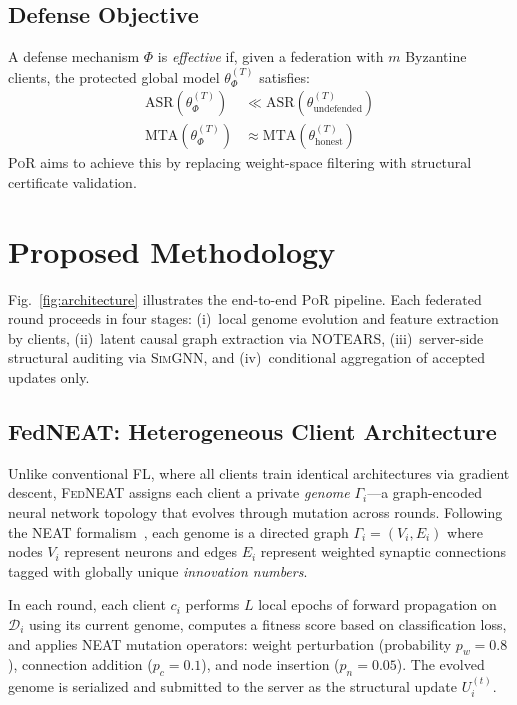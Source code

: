 \documentclass[journal]{IEEEtran}
\newcommand{\por}{\textsc{PoR}}
\newcommand{\fedneat}{\textsc{FedNEAT}}
\newcommand{\simgnn}{\textsc{SimGNN}}
\newcommand{\notears}{\textsc{NOTEARS}}
\newcommand{\asr}{\ensuremath{\mathrm{ASR}}}
\newcommand{\mta}{\ensuremath{\mathrm{MTA}}}
\newcommand{\calD}{\mathcal{D}}
\begin{document}
\subsection{Defense Objective}

A defense mechanism $\Phi$ is \textit{effective} if, given a federation with
$m$ Byzantine clients, the protected global model $\theta^{(T)}_\Phi$
satisfies:
\begin{align}
  \asr(\theta^{(T)}_\Phi) &\ll \asr(\theta^{(T)}_{\text{undefended}}) \\
  \mta(\theta^{(T)}_\Phi) &\approx \mta(\theta^{(T)}_{\text{honest}})
\end{align}
\por{} aims to achieve this by replacing weight-space filtering with
structural certificate validation.

\section{Proposed Methodology}
\label{sec:method}

Fig.~\ref{fig:architecture} illustrates the end-to-end \por{} pipeline.
Each federated round proceeds in four stages:
(i)~local genome evolution and feature extraction by clients,
(ii)~latent causal graph extraction via \notears{},
(iii)~server-side structural auditing via \simgnn{}, and
(iv)~conditional aggregation of accepted updates only.

\subsection{FedNEAT: Heterogeneous Client Architecture}
\label{sec:fedneat}

Unlike conventional FL, where all clients train identical architectures via
gradient descent, \fedneat{} assigns each client a private \textit{genome}
$\Gamma_i$---a graph-encoded neural network topology that evolves through
mutation across rounds. Following the NEAT formalism~\cite{stanley2002neat},
each genome is a directed graph $\Gamma_i = (V_i, E_i)$ where nodes
$V_i$ represent neurons and edges $E_i$ represent weighted synaptic
connections tagged with globally unique \textit{innovation numbers}.

In each round, each client $c_i$ performs $L$ local epochs of forward
propagation on $\calD_i$ using its current genome, computes a fitness
score based on classification loss, and applies NEAT mutation operators:
weight perturbation (probability $p_w = 0.8$), connection addition
($p_c = 0.1$), and node insertion ($p_n = 0.05$). The evolved genome is
serialized and submitted to the server as the structural update $U_i^{(t)}$.
\end{document}
